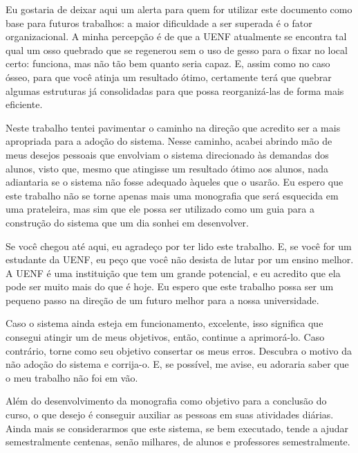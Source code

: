 Eu gostaria de deixar aqui um alerta para quem for utilizar este documento como base para futuros trabalhos: a maior dificuldade a ser superada é o fator organizacional. A minha percepção é de que a UENF atualmente se encontra tal qual um osso quebrado que se regenerou sem o uso de gesso para o fixar no local certo: funciona, mas não tão bem quanto seria capaz. E, assim como no caso ósseo, para que você atinja um resultado ótimo, certamente terá que quebrar algumas estruturas já consolidadas para que possa reorganizá-las de forma mais eficiente.

Neste trabalho tentei pavimentar o caminho na direção que acredito ser a mais apropriada para a adoção do sistema. Nesse caminho, acabei abrindo mão de meus desejos pessoais que envolviam o sistema direcionado às demandas dos alunos, visto que, mesmo que atingisse um resultado ótimo aos alunos, nada adiantaria se o sistema não fosse adequado àqueles que o usarão. Eu espero que este trabalho não se torne apenas mais uma monografia que será esquecida em uma prateleira, mas sim que ele possa ser utilizado como um guia para a construção do sistema que um dia sonhei em desenvolver.

Se você chegou até aqui, eu agradeço por ter lido este trabalho. E, se você for um estudante da UENF, eu peço que você não desista de lutar por um ensino melhor. A UENF é uma instituição que tem um grande potencial, e eu acredito que ela pode ser muito mais do que é hoje. Eu espero que este trabalho possa ser um pequeno passo na direção de um futuro melhor para a nossa universidade.

Caso o sistema ainda esteja em funcionamento, excelente, isso significa que consegui atingir um de meus objetivos, então, continue a aprimorá-lo. Caso contrário, torne como seu objetivo consertar os meus erros. Descubra o motivo da não adoção do sistema e corrija-o. E, se possível, me avise, eu adoraria saber que o meu trabalho não foi em vão.

Além do desenvolvimento da monografia como objetivo para a conclusão do curso, o que desejo é conseguir auxiliar as pessoas em suas atividades diárias. Ainda mais se considerarmos que este sistema, se bem executado, tende a ajudar semestralmente centenas, senão milhares, de alunos e professores semestralmente.
